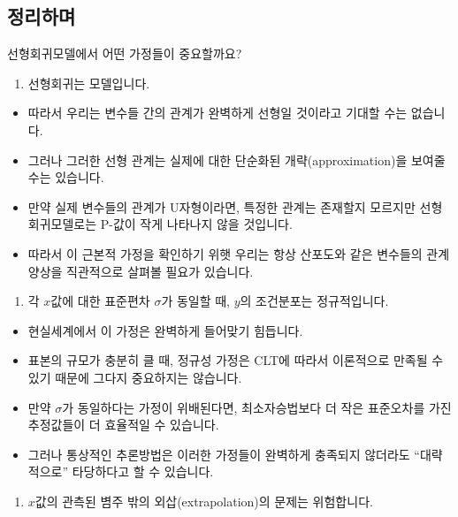\documentclass[]{book}
\providecommand{\tightlist}{%
  \setlength{\itemsep}{0pt}\setlength{\parskip}{0pt}}
\begin{document}
\hypertarget{uxc815uxb9acuxd558uxba70}{%
\subsection{정리하며}\label{uxc815uxb9acuxd558uxba70}}

선형회귀모델에서 어떤 가정들이 중요할까요?

\begin{enumerate}
\def\labelenumi{\arabic{enumi}.}
\tightlist
\item
  선형회귀는 모델입니다.
\end{enumerate}

\begin{itemize}
\tightlist
\item
  따라서 우리는 변수들 간의 관계가 완벽하게 선형일 것이라고 기대할 수는 없습니다.
\item
  그러나 그러한 선형 관계는 실제에 대한 단순화된 개략(approximation)을 보여줄 수는 있습니다.
\item
  만약 실제 변수들의 관계가 U자형이라면, 특정한 관계는 존재할지 모르지만 선형회귀모델로는 P-값이 작게 나타나지 않을 것입니다.
\item
  따라서 이 근본적 가정을 확인하기 위햇 우리는 항상 산포도와 같은 변수들의 관계 양상을 직관적으로 살펴볼 필요가 있습니다.
\end{itemize}

\begin{enumerate}
\def\labelenumi{\arabic{enumi}.}
\setcounter{enumi}{1}
\tightlist
\item
  각 \(x\)값에 대한 표준편차 \(\sigma\)가 동일할 때, \(y\)의 조건분포는 정규적입니다.
\end{enumerate}

\begin{itemize}
\tightlist
\item
  현실세계에서 이 가정은 완벽하게 들어맞기 힘듭니다.
\item
  표본의 규모가 충분히 클 때, 정규성 가정은 CLT에 따라서 이론적으로 만족될 수 있기 때문에 그다지 중요하지는 않습니다.
\item
  만약 \(\sigma\)가 동일하다는 가정이 위배된다면, 최소자승법보다 더 작은 표준오차를 가진 추정값들이 더 효율적일 수 있습니다.
\item
  그러나 통상적인 추론방법은 이러한 가정들이 완벽하게 충족되지 않더라도 ``대략적으로'' 타당하다고 할 수 있습니다.
\end{itemize}

\begin{enumerate}
\def\labelenumi{\arabic{enumi}.}
\setcounter{enumi}{2}
\tightlist
\item
  \(x\)값의 관측된 볌주 밖의 외삽(extrapolation)의 문제는 위험합니다.
\end{enumerate}
\end{document}
